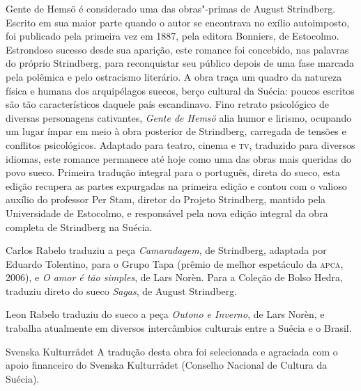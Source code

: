 \begin{resumopage}
\item[Gente de Hemsö] é considerado uma das obras"-primas de August Strindberg. 
Escrito em sua maior parte quando o autor se encontrava no exílio autoimposto, 
foi publicado pela primeira vez em 1887, pela editora Bonniers, de Estocolmo.  
Estrondoso sucesso desde sua aparição, este romance foi concebido, nas palavras do próprio 
Strindberg, para reconquistar seu público depois de uma fase marcada pela polêmica e pelo 
ostracismo literário.  A obra traça um quadro da natureza física e humana dos arquipélagos suecos, 
berço cultural da Suécia: poucos escritos são tão característicos daquele país 
escandinavo. Fino retrato psicológico de diversas personagens cativantes,  
\textit{Gente de Hemsö} alia humor e lirismo, ocupando um lugar ímpar 
em meio à obra posterior de Strindberg, carregada de tensões e conflitos 
psicológicos.  Adaptado para teatro, cinema e \textsc{tv}, traduzido para diversos idiomas, 
este romance permanece até hoje como uma das obras mais queridas do povo sueco. 
Primeira tradução integral para o português, direta do sueco, esta edição recupera as partes 
expurgadas na primeira edição e contou com o valioso auxílio do professor Per Stam, 
diretor do Projeto Strindberg, mantido pela Universidade de Estocolmo, e responsável pela nova 
edição integral da obra completa de Strindberg na Suécia. 

\item[Carlos Rabelo] traduziu a peça \textit{Camaradagem},
de Strindberg, adaptada por Eduardo Tolentino, para o Grupo Tapa (prêmio de
melhor espetáculo da \textsc{apca}, 2006), e \textit{O amor é tão simples}, de
Lars Norèn. Para a Coleção de Bolso Hedra, traduziu direto do sueco
\textit{Sagas}, de August Strindberg.

\item[Leon Rabelo] traduziu do sueco a peça \textit{Outono e Inverno}, de Lars Norèn, 
e trabalha atualmente em diversos intercâmbios culturais entre a Suécia e o Brasil.

\item[Svenska Kulturrådet] A tradução desta obra foi selecionada e agraciada com o apoio financeiro do Svenska Kulturrådet 
(Conselho Nacional de Cultura da Suécia).


\end{resumopage}

